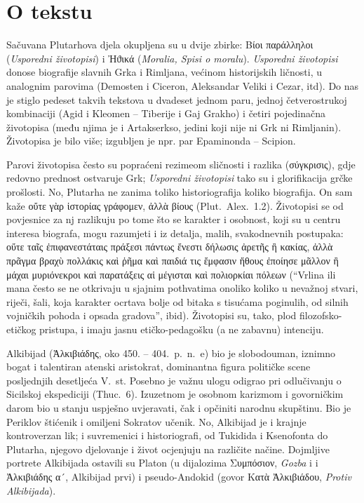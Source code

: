 
\section*{O tekstu}

Sačuvana Plutarhova djela okupljena su u dvije zbirke: Βίοι παράλληλοι (\textit{Usporedni životopisi}) i Ἠϑικά (\textit{Moralia, Spisi o moralu}). \textit{Usporedni životopisi} donose biografije slavnih Grka i Rimljana, većinom historijskih ličnosti, u analognim parovima (Demosten i Ciceron, Aleksandar Veliki i Cezar, itd). Do nas je stiglo pedeset takvih tekstova u dvadeset jednom paru, jednoj četverostrukoj kombinaciji (Agid i Kleomen – Tiberije i Gaj Grakho) i četiri pojedinačna životopisa (među njima je i Artakserkso, jedini koji nije ni Grk ni Rimljanin). Životopisa je bilo više; izgubljen je npr. par Epaminonda – Scipion.

Parovi životopisa često su popraćeni rezimeom sličnosti i razlika \textgreek[variant=ancient]{(σύγκρισις),} gdje redovno prednost ostvaruje Grk; \textit{Usporedni životopisi} tako su i glorifikacija grčke prošlosti. No, Plutarha ne zanima toliko historiografija koliko biografija. On sam kaže \textgreek[variant=ancient]{οὔτε γὰρ ἱστορίας γράφομεν, ἀλλὰ βίους} (Plut.\ Alex.~1.2). Životopisi se od povjesnice za nj razlikuju po tome što se karakter i osobnost, koji su u centru interesa biografa, mogu razumjeti i iz detalja, malih, svakodnevnih postupaka: \textgreek[variant=ancient]{οὔτε ταῖς ἐπιφανεστάταις πράξεσι πάντως ἔνεστι δήλωσις ἀρετῆς ἢ κακίας, ἀλλὰ πρᾶγμα βραχὺ πολλάκις καὶ ῥῆμα καὶ παιδιά τις ἔμφασιν ἤθους ἐποίησε μᾶλλον ἢ μάχαι μυριόνεκροι καὶ παρατάξεις αἱ μέγισται καὶ πολιορκίαι πόλεων} (``Vrlina ili mana često se ne otkrivaju u sjajnim pothvatima onoliko koliko u nevažnoj stvari, riječi, šali, koja karakter ocrtava bolje od bitaka s tisućama poginulih, od silnih vojničkih pohoda i opsada gradova'', ibid). Životopisi su, tako, plod filozofsko-etičkog pristupa, i imaju jasnu etičko-pedagošku (a ne zabavnu) intenciju. 

Alkibijad (Ἀλκιβιάδης, oko 450. – 404.\ p.~n.~e) bio je slobodouman, iznimno bogat i talentiran atenski aristokrat, dominantna figura političke scene posljednjih desetljeća V.\ st. Posebno je važnu ulogu odigrao pri odlučivanju o Sicilskoj ekspediciji (Thuc.~6). Izuzetnom je osobnom karizmom i govorničkim darom bio u stanju uspješno uvjeravati, čak i opčiniti narodnu skupštinu. Bio je Periklov štićenik i omiljeni Sokratov učenik. No, Alkibijad je i krajnje kontroverzan lik; i suvremenici i historiografi, od Tukidida i Ksenofonta do Plutarha, njegovo djelovanje i život ocjenjuju na različite načine. Dojmljive portrete Alkibijada ostavili su Platon (u dijalozima \textgreek[variant=ancient]{Συμπόσιον,} \textit{Gozba} i i \textgreek{Ἀλκιβιάδης α´,} Alkibijad prvi) i pseudo-Andokid (govor \textgreek[variant=ancient]{Κατὰ Ἀλκιβιάδου,} \textit{Protiv Alkibijada}).

